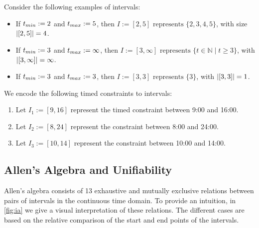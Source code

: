   \begin{example}
  Consider the following examples of intervals:
\begin{itemize}
    \item If \(t_{min} := 2\) and \(t_{max} := 5\), then \(I := [2, 5] \text{ represents } \{ 2, 3, 4, 5 \}\), with size $\vert [2,5]\vert=4$.
    \item If \(t_{min} := 3\) and \(t_{max} := \infty\), then \(I := [3, \infty] \text{ represents }\{ t \in \mathbb{N} \mid t \geq 3 \}\), with $\vert [3, \infty]\vert= \infty$.
    \item If \(t_{min} := 3\) and \(t_{max} := 3\), then \(I := [3, 3] \text{ represents } \{ 3\}\), with $\vert [3,3]\vert=1$.
\end{itemize}

We encode the following timed constraints to intervals:
\begin{enumerate}
    \item Let $I_1:=[9,16]$ represent the timed constraint between 9:00 and 16:00.
    \item Let $I_2:=[8, 24]$ represent the constraint between 8:00 and 24:00.
    \item Let $I_3:=[10,14]$ represent the constraint between 10:00 and 14:00.
\end{enumerate}

\end{example}


\subsection{Allen's Algebra and Unifiability}


Allen's algebra \cite{allen1983maintaining} consists of 13 exhaustive and mutually exclusive relations between pairs of intervals in the continuous time domain. To provide an intuition, in \ref{fig:ia} we give a visual interpretation of these relations. The different cases are based on the relative comparison of the start and end points of the intervals.


